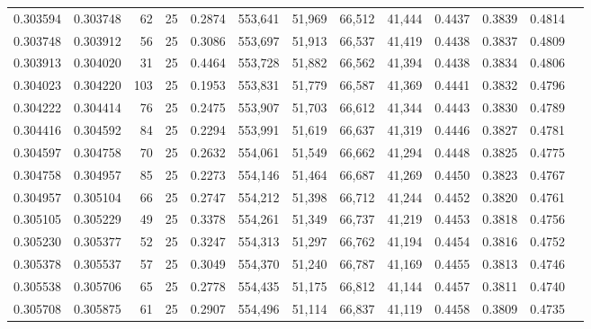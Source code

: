 \begin{tabular}{rrrrrrrrrrrrr}
0.303594 & 0.303748 &    62 &  25 &                                     0.2874 & 553,641 &  51,969 &  66,512 &  41,444 & 0.4437 & 0.3839 & 0.4814 \\
0.303748 & 0.303912 &    56 &  25 &                                     0.3086 & 553,697 &  51,913 &  66,537 &  41,419 & 0.4438 & 0.3837 & 0.4809 \\
0.303913 & 0.304020 &    31 &  25 &                                     0.4464 & 553,728 &  51,882 &  66,562 &  41,394 & 0.4438 & 0.3834 & 0.4806 \\
0.304023 & 0.304220 &   103 &  25 &                                     0.1953 & 553,831 &  51,779 &  66,587 &  41,369 & 0.4441 & 0.3832 & 0.4796 \\
0.304222 & 0.304414 &    76 &  25 &                                     0.2475 & 553,907 &  51,703 &  66,612 &  41,344 & 0.4443 & 0.3830 & 0.4789 \\
0.304416 & 0.304592 &    84 &  25 &                                     0.2294 & 553,991 &  51,619 &  66,637 &  41,319 & 0.4446 & 0.3827 & 0.4781 \\
0.304597 & 0.304758 &    70 &  25 &                                     0.2632 & 554,061 &  51,549 &  66,662 &  41,294 & 0.4448 & 0.3825 & 0.4775 \\
0.304758 & 0.304957 &    85 &  25 &                                     0.2273 & 554,146 &  51,464 &  66,687 &  41,269 & 0.4450 & 0.3823 & 0.4767 \\
0.304957 & 0.305104 &    66 &  25 &                                     0.2747 & 554,212 &  51,398 &  66,712 &  41,244 & 0.4452 & 0.3820 & 0.4761 \\
0.305105 & 0.305229 &    49 &  25 &                                     0.3378 & 554,261 &  51,349 &  66,737 &  41,219 & 0.4453 & 0.3818 & 0.4756 \\
0.305230 & 0.305377 &    52 &  25 &                                     0.3247 & 554,313 &  51,297 &  66,762 &  41,194 & 0.4454 & 0.3816 & 0.4752 \\
0.305378 & 0.305537 &    57 &  25 &                                     0.3049 & 554,370 &  51,240 &  66,787 &  41,169 & 0.4455 & 0.3813 & 0.4746 \\
0.305538 & 0.305706 &    65 &  25 &                                     0.2778 & 554,435 &  51,175 &  66,812 &  41,144 & 0.4457 & 0.3811 & 0.4740 \\
0.305708 & 0.305875 &    61 &  25 &                                     0.2907 & 554,496 &  51,114 &  66,837 &  41,119 & 0.4458 & 0.3809 & 0.4735 \\

\end{tabular}
